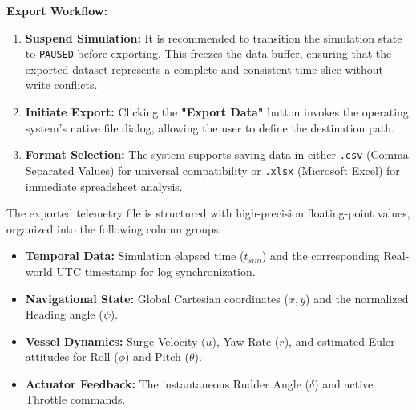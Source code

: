 \documentclass[12pt, a4paper, oneside]{report}
\begin{document}
\textbf{Export Workflow:}
\begin{enumerate}
    \item \textbf{Suspend Simulation:} It is recommended to transition the simulation state to \texttt{PAUSED} before exporting. This freezes the data buffer, ensuring that the exported dataset represents a complete and consistent time-slice without write conflicts.
    \item \textbf{Initiate Export:} Clicking the \textbf{"Export Data"} button invokes the operating system's native file dialog, allowing the user to define the destination path.
    \item \textbf{Format Selection:} The system supports saving data in either \texttt{.csv} (Comma Separated Values) for universal compatibility or \texttt{.xlsx} (Microsoft Excel) for immediate spreadsheet analysis.
\end{enumerate}

\noindent The exported telemetry file is structured with high-precision floating-point values, organized into the following column groups:
\begin{itemize}
    \item \textbf{Temporal Data:} Simulation elapsed time ($t_{sim}$) and the corresponding Real-world UTC timestamp for log synchronization.
    \item \textbf{Navigational State:} Global Cartesian coordinates ($x, y$) and the normalized Heading angle ($\psi$).
    \item \textbf{Vessel Dynamics:} Surge Velocity ($u$), Yaw Rate ($r$), and estimated Euler attitudes for Roll ($\phi$) and Pitch ($\theta$).
    \item \textbf{Actuator Feedback:} The instantaneous Rudder Angle ($\delta$) and active Throttle commands.
\end{itemize}
\end{document}
